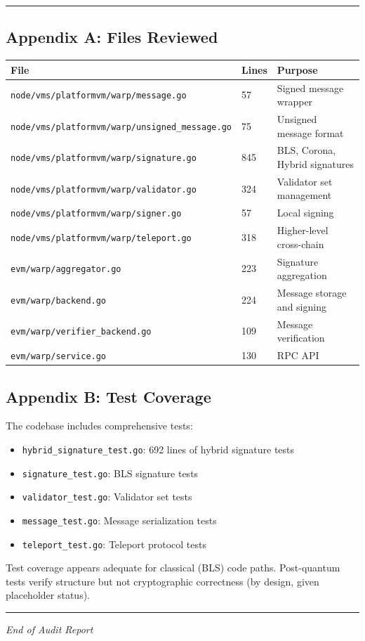 \documentclass[
]{article}
\newcounter{none} %
\providecommand{\tightlist}{%
  \setlength{\itemsep}{0pt}\setlength{\parskip}{0pt}}
\begin{document}
\begin{center}\rule{0.5\linewidth}{0.5pt}\end{center}

\subsection{Appendix A: Files Reviewed}\label{appendix-a-files-reviewed}

{\def\LTcaptype{none} %
\begin{longtable}[]{@{}lll@{}}
\toprule\noalign{}
File & Lines & Purpose \\
\midrule\noalign{}
\endhead
\bottomrule\noalign{}
\endlastfoot
\texttt{node/vms/platformvm/warp/message.go} & 57 & Signed message
wrapper \\
\texttt{node/vms/platformvm/warp/unsigned\_message.go} & 75 & Unsigned
message format \\
\texttt{node/vms/platformvm/warp/signature.go} & 845 & BLS, Corona,
Hybrid signatures \\
\texttt{node/vms/platformvm/warp/validator.go} & 324 & Validator set
management \\
\texttt{node/vms/platformvm/warp/signer.go} & 57 & Local signing \\
\texttt{node/vms/platformvm/warp/teleport.go} & 318 & Higher-level
cross-chain \\
\texttt{evm/warp/aggregator.go} & 223 & Signature aggregation \\
\texttt{evm/warp/backend.go} & 224 & Message storage and signing \\
\texttt{evm/warp/verifier\_backend.go} & 109 & Message verification \\
\texttt{evm/warp/service.go} & 130 & RPC API \\
\end{longtable}
}

\subsection{Appendix B: Test Coverage}\label{appendix-b-test-coverage}

The codebase includes comprehensive tests:

\begin{itemize}
\tightlist
\item
  \texttt{hybrid\_signature\_test.go}: 692 lines of hybrid signature
  tests
\item
  \texttt{signature\_test.go}: BLS signature tests
\item
  \texttt{validator\_test.go}: Validator set tests
\item
  \texttt{message\_test.go}: Message serialization tests
\item
  \texttt{teleport\_test.go}: Teleport protocol tests
\end{itemize}

Test coverage appears adequate for classical (BLS) code paths.
Post-quantum tests verify structure but not cryptographic correctness
(by design, given placeholder status).

\begin{center}\rule{0.5\linewidth}{0.5pt}\end{center}

\emph{End of Audit Report}
\end{document}
